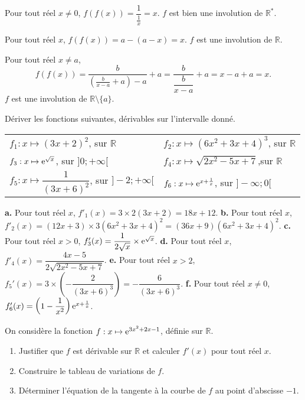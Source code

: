 \documentclass[11pt,fleqn]{book} %
\begin{document}
\begin{solution}
Pour tout réel $x\neq 0$, $f(f(x))=\dfrac{1}{\frac{1}{x}}=x$. $f$ est bien une involution de $\mathbb{R}^*$.

Pour tout réel $x$, $f(f(x))=a-(a-x)=x$. $f$ est une involution de $\mathbb{R}$.

Pour tout réel $x\neq a$,
\[f(f(x))=\dfrac{b}{\left(\frac{b}{x-a}+a\right)-a}+a=\dfrac{b}{\dfrac{b}{x-a}}+a=x-a+a=x.\]
$f$ est une involution de $\mathbb{R}\setminus \{a\}$.\end{solution}




\begin{exercise}Dériver les fonctions suivantes, dérivables sur l'intervalle donné.

\renewcommand{\arraystretch}{2}
\begin{tabularx}{\linewidth}{XX}
 $f_1 : x \mapsto (3x+2)^2$, sur $\mathbb{R}$ &
 $f_2 : x \mapsto (6x^2+3x+4)^3$,  sur $\mathbb{R}$ \\
  $f_3 : x \mapsto \mathrm{e}^{\sqrt{x}}$,  sur $]0;+\infty[$ &
$f_4 : x \mapsto \sqrt{2x^2-5x+7}$,sur $\mathbb{R}$ \\
  $f_5 : x \mapsto \dfrac{1}{(3x+6)^2}$, sur $]-2;+\infty[$ &
$f_6 : x \mapsto \mathrm{e}^{x+\frac{1}{x}}$,  sur $]-\infty;0[$ 
\end{tabularx}\end{exercise}

\begin{solution}\textbf{a.} Pour tout réel $x$, $f'_1(x)=3\times 2 (3x+2)=18x+12$.
\vskip5pt
\textbf{b.} Pour tout réel $x$, $f'_2(x)=(12x+3)\times 3(6x^2+3x+4)^2=(36x+9)(6x^2+3x+4)^2$.
\vskip5pt
\textbf{c.} Pour tout réel $x>0$, $f'_3(x)=\dfrac{1}{2\sqrt{x}}\times \mathrm{e}^{\sqrt{x}}$.
\vskip5pt
\textbf{d.} Pour tout réel $x$, $f'_4(x)=\dfrac{4x-5}{2\sqrt{2x^2-5x+7}}$.
\vskip5pt
\textbf{e.} Pour tout réel $x>2$, $f_5'(x)=3 \times \left(-\dfrac{2}{(3x+6)^3}\right)=-\dfrac{6}{(3x+6)^3}$.
\vskip5pt
\textbf{f.} Pour tout réel $x\neq 0$, $f'_6(x)=\left(1-\dfrac{1}{x^2}\right)\mathrm{e}^{x+\frac{1}{x}}$.\end{solution}




\begin{exercise}On considère la fonction $f:x\mapsto \mathrm{e}^{3x^2+2x-1}$, définie sur $\mathbb{R}$.
\begin{enumerate}
\item Justifier que $f$ est dérivable sur $\mathbb{R}$ et calculer $f'(x)$ pour tout réel $x$.
\item Construire le tableau de variations de $f$.
\item Déterminer l'équation de la tangente à la courbe de $f$ au point d'abscisse $-1$.
\end{enumerate}
\newpage \end{exercise}
\end{document}
